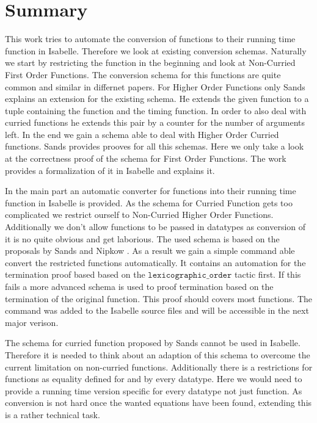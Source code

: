 
\chapter{Summary}\label{chapter:summary}

This work tries to automate the conversion of functions to their running time function in Isabelle.
Therefore we look at existing conversion schemas.
Naturally we start by restricting the function in the beginning and look at Non-Curried First Order Functions.
The conversion schema for this functions are quite common and similar in differnet papers.
For Higher Order Functions only Sands explains an extension for the existing schema.
He extends the given function to a tuple containing the function and the timing function.
In order to also deal with curried functions he extends this pair by a counter for the number of arguments left.
In the end we gain a schema able to deal with Higher Order Curried functions.
Sands provides prooves for all this schemas.
Here we only take a look at the correctness proof of the schema for First Order Functions.
The work provides a formalization of it in Isabelle and explains it.

In the main part an automatic converter for functions into their running time function in Isabelle is provided.
As the schema for Curried Function gets too complicated we restrict ourself to Non-Curried Higher Order Functions.
Additionally we don't allow functions to be passed in datatypes as conversion of it is no quite obvious and get laborious.
The used schema is based on the proposals by Sands \parencite{sands} and Nipkow \parencite{fds}.
As a result we gain a simple command able convert the restricted functions automatically.
It contains an automation for the termination proof based based on the $\texttt{lexicographic\_order}$ tactic first.
If this fails a more advanced schema is used to proof termination based on the termination of the original function.
This proof should covers most functions.
The command was added to the Isabelle source files and will be accessible in the next major verison.

The schema for curried function proposed by Sands cannot be used in Isabelle.
Therefore it is needed to think about an adaption of this schema to overcome the current limitation on non-curried functions.
Additionally there is a restrictions for functions as equality defined for and by every datatype.
Here we would need to provide a running time version specific for every datatype not just function.
As conversion is not hard once the wanted equations have been found, extending this is a rather technical task.
